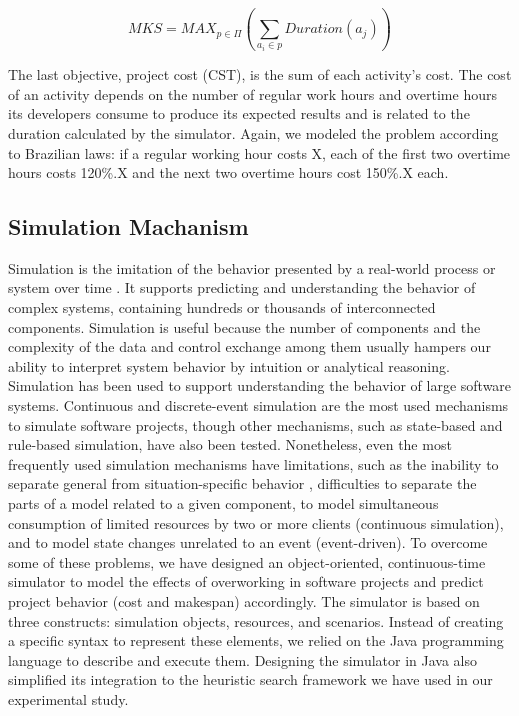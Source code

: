 \documentclass[conference]{IEEEtran}
\begin{document}
\[
MKS = MAX_{p\in\Pi} (\sum_{a_{i} \in p} Duration (a_{j}))
\]

The last objective, project cost (CST), is the sum of each activity’s cost. The cost of an activity depends on the number of regular work hours and overtime hours its developers consume to produce its expected results and is related to the duration calculated by the simulator. Again, we modeled the problem according to Brazilian laws: if a regular working hour costs X, each of the first two overtime hours costs 120\%.X and the next two overtime hours cost 150\%.X each.


\subsection{Simulation Machanism}
Simulation is the imitation of the behavior presented by a real-world process or system over time \cite{Banks:2000}. It supports predicting and understanding the behavior of complex systems, containing hundreds or thousands of interconnected components. Simulation is useful because the number of components and the complexity of the data and control exchange among them usually hampers our ability to interpret system behavior by intuition or analytical reasoning.
Simulation has been used to support understanding the behavior of large software systems. Continuous \cite{Forrester:1961} and discrete-event \cite{Ross:1990} simulation are the most used mechanisms to simulate software projects, though other mechanisms, such as state-based \cite{harel:1990} and rule-based \cite{Drappa:1999} simulation, have also been tested. Nonetheless, even the most frequently used simulation mechanisms have limitations, such as the inability to separate general from situation-specific behavior \cite{Barros:2002}, difficulties to separate the parts of a model related to a given component, to model simultaneous consumption of limited resources by two or more clients (continuous simulation), and to model state changes unrelated to an event (event-driven).
To overcome some of these problems, we have designed an object-oriented, continuous-time simulator to model the effects of overworking in software projects and predict project behavior (cost and makespan) accordingly. The simulator is based on three constructs: simulation objects, resources, and scenarios. Instead of creating a specific syntax to represent these elements, we relied on the Java programming language to describe and execute them. Designing the simulator in Java also simplified its integration to the heuristic search framework we have used in our experimental study.
\end{document}
